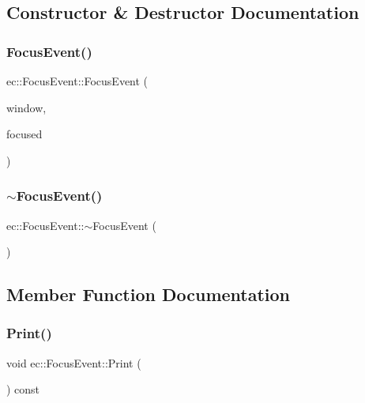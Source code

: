 \subsection{Constructor \& Destructor Documentation}
\mbox{\label{structec_1_1_focus_event_ab160b94dd4af651dacdd6049cfdabe0a}} 
\subsubsection{\texorpdfstring{Focus\+Event()}{FocusEvent()}}
{\footnotesize\ttfamily ec\+::\+Focus\+Event\+::\+Focus\+Event (\begin{DoxyParamCaption}\item[{G\+L\+F\+Wwindow $\ast$}]{window,  }\item[{const bool}]{focused }\end{DoxyParamCaption})}

\mbox{\label{structec_1_1_focus_event_ab59b3bde4ad39accab7fadd830b5f226}} 
\subsubsection{\texorpdfstring{$\sim$\+Focus\+Event()}{~FocusEvent()}}
{\footnotesize\ttfamily ec\+::\+Focus\+Event\+::$\sim$\+Focus\+Event (\begin{DoxyParamCaption}{ }\end{DoxyParamCaption})}



\subsection{Member Function Documentation}
\mbox{\label{structec_1_1_focus_event_a31a1f08d96f83cbb906f92be18bc8bfb}} 
\subsubsection{\texorpdfstring{Print()}{Print()}}
{\footnotesize\ttfamily void ec\+::\+Focus\+Event\+::\+Print (\begin{DoxyParamCaption}{ }\end{DoxyParamCaption}) const}



